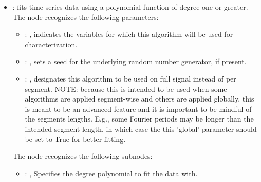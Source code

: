 \begin{itemize}
    \item {}:
      fits time-series data using a polynomial function of degree one or greater.
      The  node recognizes the following parameters:
        \begin{itemize}
          \item {}: ,
            indicates the variables for which this algorithm will be used for characterization.
          \item {}: ,
            sets a seed for the underlying random number generator, if present.
          \item {}: ,
            designates this algorithm to be used on full signal instead of per
            segment. NOTE: because this is intended to be used when some algorithms are
            applied segment-wise and others are applied globally, this is meant to be an
            advanced feature and it is important to be mindful of the segments lengths.
            E.g., some Fourier periods may be longer than the intended segment length, in
            which case the this 'global' parameter should be set to True for better
            fitting. 
      \end{itemize}

      The  node recognizes the following subnodes:
      \begin{itemize}
        \item {}: ,
          Specifies the degree polynomial to fit the data with.
      \end{itemize}


\end{itemize}
